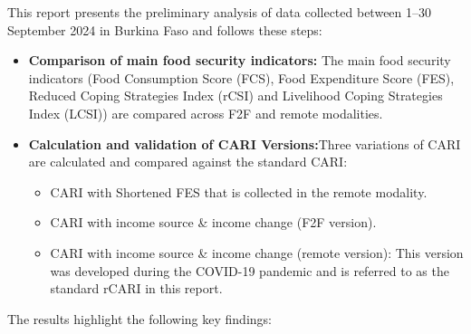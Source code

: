 \documentclass[11pt,harvard]{article}
\begin{document}
	This report presents the preliminary analysis of data collected between 1–30 September 2024 in Burkina Faso and follows these steps:

	\begin{itemize}
		\item\textbf{Comparison of main food security indicators:} The main food security indicators (Food Consumption Score (FCS), Food Expenditure Score (FES), Reduced Coping Strategies Index (rCSI) and Livelihood Coping Strategies Index (LCSI)) are compared across F2F and remote modalities.
		\item\textbf{Calculation and validation of CARI Versions:}Three variations of CARI are calculated and compared against the standard CARI:
		\begin{itemize}
			\item[1.] CARI with Shortened FES that is collected in the remote modality.
			\item[2.] CARI with income source \& income change (F2F version).
			\item[3.] CARI with income source \& income change (remote version): This version was developed during the COVID-19 pandemic and is referred to as the standard rCARI in this report.
		\end{itemize}
	\end{itemize}

		
	The results highlight the following key findings:
	 
\end{document}
